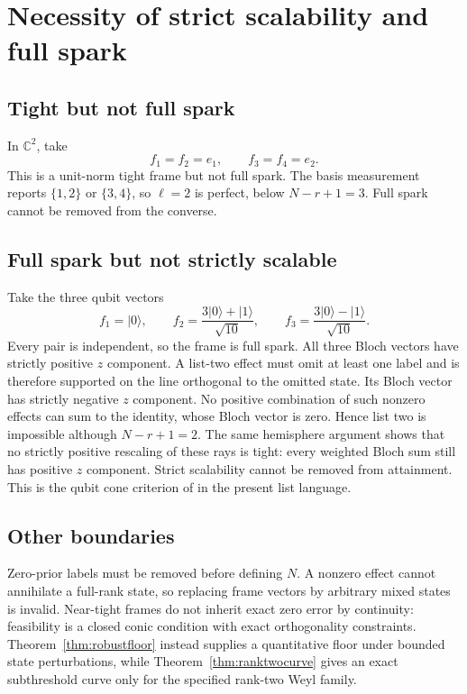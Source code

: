 \documentclass[11pt,a4paper]{article}
\newcommand{\C}{\mathbb{C}}
\newcommand{\ket}[1]{\lvert #1\rangle}
\begin{document}
\section{Necessity of strict scalability and full spark}\label{sec:counterexamples}

\subsection{Tight but not full spark}

In $\C^2$, take
\[
 f_1=f_2=e_1,\qquad f_3=f_4=e_2.
\]
This is a unit-norm tight frame but not full spark.  The basis measurement
reports $\{1,2\}$ or $\{3,4\}$, so $\ell=2$ is perfect, below
$N-r+1=3$.  Full spark cannot be removed from the converse.

\subsection{Full spark but not strictly scalable}

Take the three qubit vectors
\[
 f_1=\ket0,\qquad
 f_2=\frac{3\ket0+\ket1}{\sqrt{10}},\qquad
 f_3=\frac{3\ket0-\ket1}{\sqrt{10}}.
\]
Every pair is independent, so the frame is full spark.  All three Bloch
vectors have strictly positive $z$ component.  A list-two effect must omit at
least one label and is therefore supported on the line orthogonal to the
omitted state.  Its Bloch vector has strictly negative $z$ component.  No
positive combination of such nonzero effects can sum to the identity, whose
Bloch vector is zero.  Hence list two is impossible although
$N-r+1=2$.  The same hemisphere argument shows that no strictly positive
rescaling of these rays is tight: every weighted Bloch sum still has positive
$z$ component.  Strict scalability cannot be removed from attainment.  This is the qubit
cone criterion of \cite{HeinosaariKerppo2018} in the present list language.

\subsection{Other boundaries}

Zero-prior labels must be removed before defining $N$.  A nonzero effect
cannot annihilate a full-rank state, so replacing frame vectors by arbitrary
mixed states is invalid.  Near-tight frames do not inherit exact zero error by
continuity: feasibility is a closed conic condition with exact orthogonality
constraints.  Theorem~\ref{thm:robustfloor} instead supplies a quantitative
floor under bounded state perturbations, while
Theorem~\ref{thm:ranktwocurve} gives an exact subthreshold curve only for the
specified rank-two Weyl family.
\end{document}
